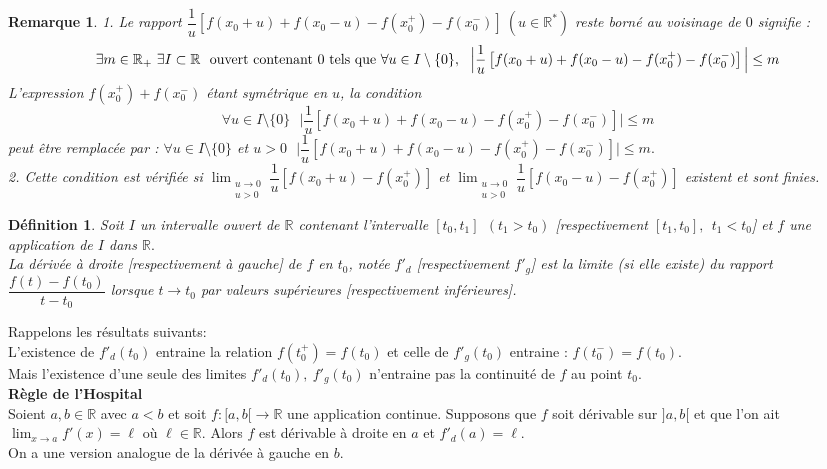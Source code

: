 \documentclass[11pt, a4paper]{book}
\newtheorem{defi}{D\'efinition}[section]
\newtheorem{rem}{Remarque}[section]
\begin{document}
\begin{rem}
1. Le rapport $\dfrac{1}{u}\left[f(x_0+u)+f(x_0-u)-f(x_0^+)-f(x_0^-)\right]~(u\in \mathbb{R}^*)$ reste born\'e au voisinage de $0$ signifie : $$\exists m\in \mathbb{R}_+~\exists I\subset \mathbb{R}~\text{ ouvert contenant $0$ tels que}\\~\forall u\in I\setminus\{0\},~~ \Big|\dfrac{1}{u}\left[f(x_0+u)+f(x_0-u)-f(x_0^+)-f(x_0^-)\right]\Big|\leq m$$
L'expression $f(x_0^+)+f(x_0^-)$ \'etant sym\'etrique en $u$, la condition $$\forall u\in I\setminus\{0\}~~~\Big|\dfrac{1}{u}\left[f(x_0+u)+f(x_0-u)-f(x_0^+)-f(x_0^-)\right]\Big|\leq m$$ peut \^etre remplac\'ee par : $\forall u\in I\setminus \{0\}$ et $u>0~~~\Big|\dfrac{1}{u}\left[f(x_0+u)+f(x_0-u)-f(x_0^+)-f(x_0^-)\right]\Big|\leq m.$\\
 2. Cette condition est v\'erifi\'ee si ${\displaystyle \lim_{\substack{u\to 0\\u>0}}\dfrac{1}{u}\left[f(x_0+u)-f(x_0^+)\right]}$ et ${\displaystyle \lim_{\substack{u\to0\\u>0}}\dfrac{1}{u}\left[f(x_0-u)-f(x_0^+)\right]}$ existent et sont finies.
\end{rem}
\begin{defi}
Soit $I$ un intervalle ouvert de $\mathbb{R}$ contenant l'intervalle $[t_0,t_1]~~(t_1>t_0)$ [respectivement $[t_1,t_0],~~t_1<t_0$] et $f$ une application de $I$ dans $\mathbb{R}.$\\
La d\'eriv\'ee \`a droite [respectivement \`a gauche] de $f$ en $t_0$, not\'ee $f'_d$ [respectivement $f'_g$] est la limite (si elle existe) du rapport $\dfrac{f(t)-f(t_0)}{t-t_0}$ lorsque $t\to t_0$ par valeurs sup\'erieures [respectivement inf\'erieures]. 
\end{defi}
Rappelons les r\'esultats suivants:\\
L'existence de $f'_d(t_0)$ entraine la relation $f(t_0^+)=f(t_0)$ et celle de $f'_g(t_0)$ entraine : $f(t_0^-)=f(t_0)$.\\
Mais l'existence d'une seule des limites $f'_d(t_0),~f'_g(t_0)$ n'entraine pas la continuit\'e de $f$ au point $t_0.$\\
\textbf{R\`egle de l'Hospital}\\
Soient $a,b\in \mathbb{R}$ avec $a<b$ et soit $f:[a,b[\to\mathbb{R}$ une application continue. Supposons que $f$ soit d\'erivable sur $]a,b[$ et que l'on ait ${\displaystyle \lim_{x\to a}f'(x)=\ell}$ o\`u $\ell\in \mathbb{R}.$ Alors $f$ est d\'erivable  \`a droite en $a$ et $f'_d(a)=\ell$.\\
On a une version analogue de la d\'eriv\'ee \`a gauche en $b$.
\end{document}
